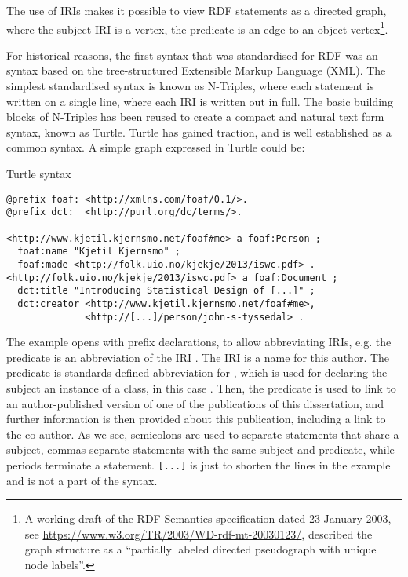 The use of IRIs makes it possible to view RDF statements as a directed
graph, where the subject IRI is a vertex, the predicate is an edge to
an object vertex\footnote{A working draft of the RDF Semantics
  specification dated 23 January 2003, see
  \url{https://www.w3.org/TR/2003/WD-rdf-mt-20030123/}, described the
  graph structure as a ``partially labeled directed pseudograph with
  unique node labels''.}.

For historical reasons, the first syntax that was standardised for RDF
was an syntax based on the tree-structured Extensible Markup Language
(XML). The simplest standardised syntax is known as N-Triples, where
each statement is written on a single line, where each IRI is written
out in full. The basic building blocks of N-Triples has been reused to
create a compact and natural text form syntax, known as Turtle. Turtle
has gained traction, and is well established as a common syntax. A
simple graph expressed in Turtle could be:

\begin{example}{Turtle syntax}\label{ex:turtle}
\small
\begin{verbatim}
@prefix foaf: <http://xmlns.com/foaf/0.1/>.
@prefix dct:  <http://purl.org/dc/terms/>.

<http://www.kjetil.kjernsmo.net/foaf#me> a foaf:Person ;
  foaf:name "Kjetil Kjernsmo" ;
  foaf:made <http://folk.uio.no/kjekje/2013/iswc.pdf> .
<http://folk.uio.no/kjekje/2013/iswc.pdf> a foaf:Document ;
  dct:title "Introducing Statistical Design of [...]" ; 
  dct:creator <http://www.kjetil.kjernsmo.net/foaf#me>, 
              <http://[...]/person/john-s-tyssedal> .
\end{verbatim}
\normalsize
\end{example}

The example opens with prefix declarations, to allow abbreviating
IRIs, e.g. the predicate  is an abbreviation of the
IRI . The IRI
 is a name for this
author. The  predicate is standards-defined abbreviation
for , which
is used for declaring the subject an instance of a class, in this case
. Then, the  predicate
is used to link to an author-published version of one of the
publications of this dissertation, and further information is then
provided about this publication, including a link to the co-author. As
we see, semicolons are used to separate statements that share a
subject, commas separate statements with the same subject and
predicate, while periods terminate a statement. \texttt{[...]} is just
to shorten the lines in the example and is not a part of the syntax.

